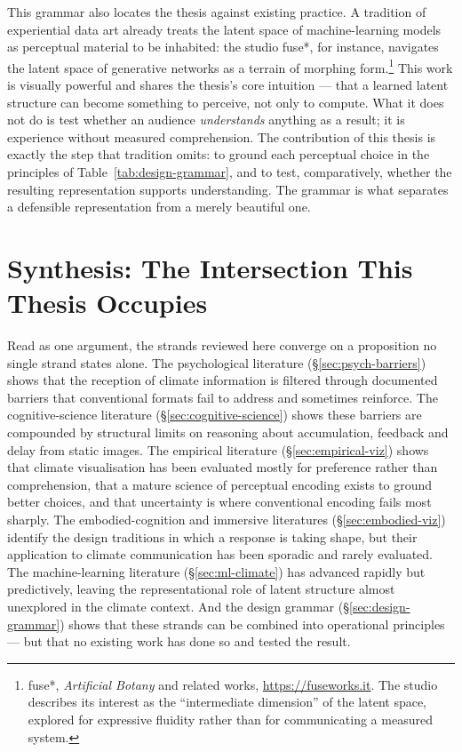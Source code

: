 This grammar also locates the thesis against existing practice. A tradition of experiential data art already treats the latent space of machine-learning models as perceptual material to be inhabited: the studio fuse*, for instance, navigates the latent space of generative networks as a terrain of morphing form.\footnote{fuse*, \emph{Artificial Botany} and related works, \url{https://fuseworks.it}. The studio describes its interest as the ``intermediate dimension'' of the latent space, explored for expressive fluidity rather than for communicating a measured system.} This work is visually powerful and shares the thesis's core intuition --- that a learned latent structure can become something to perceive, not only to compute. What it does not do is test whether an audience \emph{understands} anything as a result; it is experience without measured comprehension. The contribution of this thesis is exactly the step that tradition omits: to ground each perceptual choice in the principles of Table~\ref{tab:design-grammar}, and to test, comparatively, whether the resulting representation supports understanding. The grammar is what separates a defensible representation from a merely beautiful one.



\section{Synthesis: The Intersection This Thesis Occupies}
\label{sec:literature-synthesis}

Read as one argument, the strands reviewed here converge on a proposition no single strand states alone. The psychological literature (§\ref{sec:psych-barriers}) shows that the reception of climate information is filtered through documented barriers that conventional formats fail to address and sometimes reinforce. The cognitive-science literature (§\ref{sec:cognitive-science}) shows these barriers are compounded by structural limits on reasoning about accumulation, feedback and delay from static images. The empirical literature (§\ref{sec:empirical-viz}) shows that climate visualisation has been evaluated mostly for preference rather than comprehension, that a mature science of perceptual encoding exists to ground better choices, and that uncertainty is where conventional encoding fails most sharply. The embodied-cognition and immersive literatures (§\ref{sec:embodied-viz}) identify the design traditions in which a response is taking shape, but their application to climate communication has been sporadic and rarely evaluated. The machine-learning literature (§\ref{sec:ml-climate}) has advanced rapidly but predictively, leaving the representational role of latent structure almost unexplored in the climate context. And the design grammar (§\ref{sec:design-grammar}) shows that these strands can be combined into operational principles --- but that no existing work has done so and tested the result.

